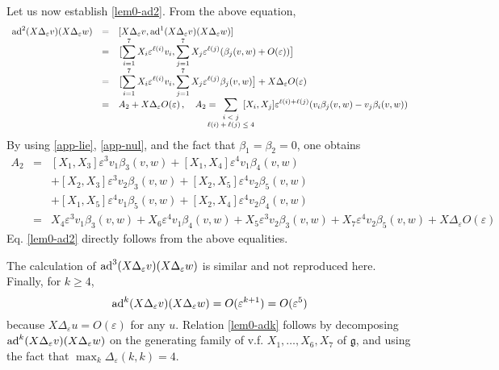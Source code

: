 \documentclass[a4paper,twoside]{article}
\def \g {{\mathfrak g}}
\def \ad {\textnormal{ad}}
\def \eps {\varepsilon}
\def \finproof{\hfill\hbox{\vrule width1.0ex height1.5ex}}
\begin{document}
Let us now establish \eqref{lem0-ad2}. From the above equation,
\[
\begin{array}{lcl}
\ad^2(X \Delta_\eps v)(X \Delta_\eps w) & = & [ X \Delta_\eps v, \ad^1(X \Delta_\eps v)(X \Delta_\eps w)]\\
 & = & \displaystyle \bigl [ \sum_{i=1}^7 X_i \eps^{\ell(i)} v_i, \sum_{j=1}^7 X_j \eps^{\ell(j)} (\beta_j(v,w) + O(\eps)) \bigr ] \\
 & = &  \displaystyle \bigl [ \sum_{i=1}^7 X_i \eps^{\ell(i)} v_i, \sum_{j=1}^7 X_j \eps^{\ell(j)} \beta_j(v,w) \bigr ] 
 + X \Delta_\eps O(\eps)  \\
 & = &  A_2  + X \Delta_\eps O(\eps) \, , \quad  A_2= \hspace*{-.6cm}
\displaystyle 
 \sum_{
\begin{scriptsize}
\begin{array}{c}
i<j \\
\ell(i) + \ell(j) \leq 4
\end{array}
\end{scriptsize}
} \hspace*{-.6cm}
[X_i,X_j] \eps^{\ell(i) + \ell(j)} 
(v_i \beta_j(v,w) -v_j \beta_i(v,w)) 
\end{array}
\]
By using \eqref{app-lie}, \eqref{app-nul}, and the fact that $\beta_1=\beta_2=0$, one obtains
\[
\begin{array}{lcl}
A_2 & = & 
[X_1,X_3] \eps^3 v_1 \beta_3(v,w) + [X_1,X_4] \eps^4 v_1 \beta_4(v,w) \\
 & & +[X_2,X_3] \eps^3 v_2 \beta_3(v,w) + [X_2,X_5] \eps^4 v_2 \beta_5(v,w) \\
 & & + [X_1,X_5] \eps^4  v_1 \beta_5(v,w) + [X_2, X_4] \eps^4  v_2 \beta_4(v,w)  \\
 & = & X_4 \eps^3 v_1 \beta_3(v,w) + X_6 \eps^4 v_1 \beta_4(v,w) + X_5 \eps^3 v_2 \beta_3(v,w) + X_7 \eps^4 v_2 \beta_5(v,w) 
+ X \Delta_\eps O(\eps)
\end{array}
\]
Eq. \eqref{lem0-ad2} directly follows from the above equalities.

The calculation of $\ad^3(X \Delta_\eps v)(X \Delta_\eps w)$ is similar and not reproduced here. Finally, for $k \geq 4$,
\[
\ad^k(X \Delta_\eps v)(X \Delta_\eps w) =O(\eps^{k+1})= O(\eps^5)
\] 
because $ X \Delta_\eps u = O(\eps)$ for any $u$. Relation \eqref{lem0-adk} follows by decomposing 
$\ad^k(X \Delta_\eps v)(X \Delta_\eps w)$ on the generating family of v.f.
 ${X_1, \ldots,X_6,X_7}$  of $\g$, and using the fact that $\max_k \Delta_\eps(k,k)= 4$. \finproof
\end{document}
